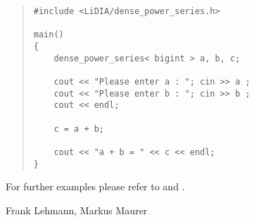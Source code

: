 
\EXAMPLES

\begin{quote}
\begin{verbatim}
#include <LiDIA/dense_power_series.h>

main()
{
    dense_power_series< bigint > a, b, c;

    cout << "Please enter a : "; cin >> a ;
    cout << "Please enter b : "; cin >> b ;
    cout << endl;

    c = a + b;

    cout << "a + b = " << c << endl;
}
\end{verbatim}
\end{quote}

For further examples please refer to  and
.



\AUTHOR

Frank Lehmann, Markus Maurer
